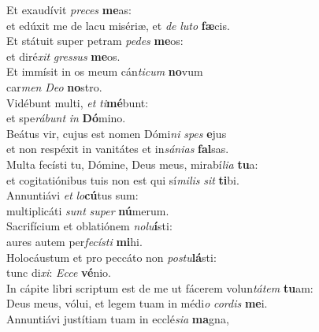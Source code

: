 \evenverse Et exaudívit \textit{pre}\textit{ces} \textbf{me}as:~\*\\
\evenverse et edúxit me de lacu misériæ, et \textit{de} \textit{lu}\textit{to} \textbf{fæ}cis.\\
\oddverse Et státuit super petram \textit{pe}\textit{des} \textbf{me}os:~\*\\
\oddverse et diré\textit{xit} \textit{gres}\textit{sus} \textbf{me}os.\\
\evenverse Et immísit in os meum cán\textit{ti}\textit{cum} \textbf{no}vum~\*\\
\evenverse car\textit{men} \textit{De}\textit{o} \textbf{no}stro.\\
\oddverse Vidébunt multi, \textit{et} \textit{ti}\textbf{mé}bunt:~\*\\
\oddverse et spe\textit{rá}\textit{bunt} \textit{in} \textbf{Dó}mino.\\
\evenverse Beátus vir, cujus est nomen Dómi\textit{ni} \textit{spes} \textbf{e}jus~\*\\
\evenverse et non respéxit in vanitátes et in\textit{sá}\textit{ni}\textit{as} \textbf{fal}sas.\\
\oddverse Multa fecísti tu, Dómine, Deus meus, mirabí\textit{li}\textit{a} \textbf{tu}a:~\*\\
\oddverse et cogitatiónibus tuis non est qui sí\textit{mi}\textit{lis} \textit{sit} \textbf{ti}bi.\\
\evenverse Annuntiávi \textit{et} \textit{lo}\textbf{cú}tus sum:~\*\\
\evenverse multiplicáti \textit{sunt} \textit{su}\textit{per} \textbf{nú}merum.\\
\oddverse Sacrifícium et oblatiónem \textit{no}\textit{lu}\textbf{í}sti:~\*\\
\oddverse aures autem per\textit{fe}\textit{cí}\textit{sti} \textbf{mi}hi.\\
\evenverse Holocáustum et pro peccáto non \textit{po}\textit{stu}\textbf{lá}sti:~\*\\
\evenverse tunc di\textit{xi}: \textit{Ec}\textit{ce} \textbf{vé}nio.\\
\oddverse In cápite libri scriptum est de me ut fácerem volun\textit{tá}\textit{tem} \textbf{tu}am:~\*\\
\oddverse Deus meus, vólui, et legem tuam in médi\textit{o} \textit{cor}\textit{dis} \textbf{me}i.\\
\evenverse Annuntiávi justítiam tuam in ecclé\textit{si}\textit{a} \textbf{ma}gna,~\*\\
